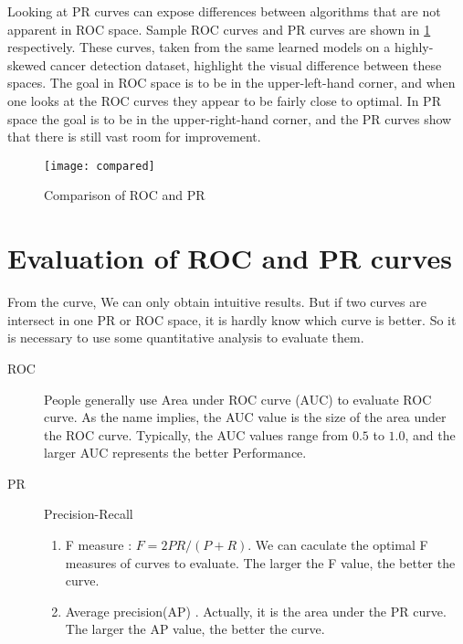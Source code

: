 \documentclass[a4paper,12pt]{article}
\begin{document}
Looking at PR curves can expose differences between algorithms that are not apparent in ROC space. Sample ROC curves and PR curves are shown in \ref{comparison} respectively. These curves, taken from the same learned models on a highly-skewed cancer detection dataset, highlight the visual difference between
these spaces. The goal in ROC space is to be in the upper-left-hand corner, and when one looks at the ROC curves they appear to be fairly close to optimal. In PR space the goal is to be in the upper-right-hand corner, and the PR curves show that there is still vast room for improvement.

\begin{figure}[!ht]
\centering\texttt{[image: compared]}
\caption{Comparison of ROC and PR}\label{comparison}
\end{figure} 




\section{Evaluation  of ROC and PR curves}
From the curve, We can only obtain intuitive results. But if two curves are intersect in one PR or ROC space, it is hardly know which curve is better. So it is necessary to use some quantitative analysis to evaluate them.
\begin{description}
\item[ROC] People generally use Area under ROC curve (AUC) to evaluate ROC curve. As the name implies, the AUC value is the size of the area under the ROC curve. Typically, the AUC values range from $0.5$ to $1.0$, and the larger AUC represents the better Performance.
\item[PR] Precision-Recall
\begin{enumerate}
\item F measure \cite{4:article} \cite{7:misc}: $F=2PR/(P+R)$. We can caculate the optimal F measures of curves to evaluate. The larger the F value, the better the curve.
\item Average precision(AP) \cite{3:article} \cite{5:article}. Actually, it is the area under the PR curve. The larger the AP value, the better the curve. 
\end{enumerate}
\end{description}

\end{document}

